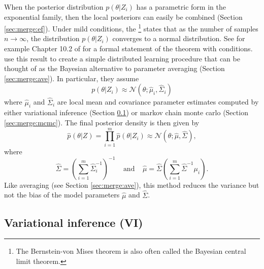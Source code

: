 \documentclass[thesis.tex]{subfiles}
\newcommand{\p}[1]{p\left({#1}\right)}
\newcommand{\psup}[2]{\hat p^{#1}({#2})}
\newcommand{\phat}[1]{\psup{}{#1}}
\newcommand{\gaussian}[3]{\mathcal N({#1};{#2},{#3})}
\begin{document}
When the posterior distribution $p(\theta|Z_i)$ has a parametric form in the exponential family,
then the local posteriors can easily be combined (Section \ref{sec:merge:ef}).
Under mild conditions, the \footnote{
    The Bernstein-von Mises theorem is also often called the Bayesian central limit theorem.
}
states that as the number of samples $n\to\infty$,
the distribution $p(\theta|Z_i)$ converges to a normal distribution. 
See for example Chapter 10.2 of \cite{vandervaart1998asymptotic} for a formal statement of the theorem with conditions.
\cite{neiswanger2014asymptotically} use this result to create a simple distributed learning procedure that can be thought of as the Bayesian alternative to parameter averaging (Section \ref{sec:merge:ave}). 
%
In particular, they assume
\begin{equation}
    \p{\theta | Z_i}
    \approx
    \gaussian{\theta}{\hat\mu_i}{\hat\Sigma_i}
\end{equation}
where $\hat\mu_i$ and $\hat\Sigma_i$ are local mean and covariance parameter estimates computed by either variational inference (Section \ref{sec:merge:vi}) or markov chain monte carlo (Section \ref{sec:merge:mcmc}).
The final posterior density is then given by
\begin{equation}
    \phat{\theta | Z}
    =
    \prod_{i=1}^m
    \phat{\theta | Z_i}
    \approx
    \gaussian{\theta}{\hat\mu}{\hat\Sigma}
    ,
\end{equation}
where
\begin{equation}
    \hat\Sigma
    =
    \left(
        \sum_{i=1}^m
        \hat\Sigma_i^{-1}
    \right)^{-1}
    ~~~~~\text{and}~~~~~
    \hat\mu
    =
    \hat\Sigma \left(\sum_{i=1}^m \hat\Sigma^{-1} \mu_i \right)
    .
\end{equation}
Like averaging (see Section \ref{sec:merge:ave}),
this method reduces the variance but not the bias of the model parameters $\hat\mu$ and $\hat\Sigma$.


\subsection{Variational inference (VI)}
\label{sec:merge:vi}
\end{document}
